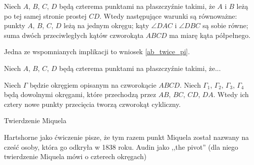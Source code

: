 \begin{proposition}
	\label{prp_incircle}
	Niech $A$, $B$, $C$, $D$ będą czterema punktami na płaszczyźnie takimi, że $A$ i $B$ leżą po tej samej stronie prostej $CD$.
	Wtedy następujące warunki są równoważne: punkty $A$, $B$, $C$, $D$ leżą na jednym okręgu; kąty $\angle DAC$ i $\angle DBC$ są sobie równe; suma dwóch przeciwległych kątów czworokąta $ABCD$ ma miarę kąta półpełnego.
\end{proposition}

Jedna ze wspomnianych implikacji to wniosek \ref{ab_twice_pi}.

\begin{proposition}
	\label{prp_excircle}
	Niech $A$, $B$, $C$, $D$ będą czterema punktami na płaszczyźnie takimi, że...
\end{proposition}

\begin{proposition}
	Niech $\Gamma$ będzie okręgiem opisanym na czworokącie $ABCD$.
	Niech $\Gamma_1$, $\Gamma_2$, $\Gamma_3$, $\Gamma_4$ będą dowolnymi okręgami, które przechodzą przez $AB$, $BC$, $CD$, $DA$.
	Wtedy ich cztery nowe punkty przecięcia tworzą czworokąt cykliczny.
\end{proposition}

Twierdzenie Miquela
%
\loremipsum
{} %

Hartshorne jako ćwiczenie \cite[s. 61]{hartshorne2000} pisze, że tym razem punkt Miquela został nazwany na cześć osoby, która go odkryła w 1838 roku.
%
Audin \cite[s. 104]{audin_2003} jako ,,the pivot'' (dla niego twierdzenie Miquela mówi o czterech okręgach)
